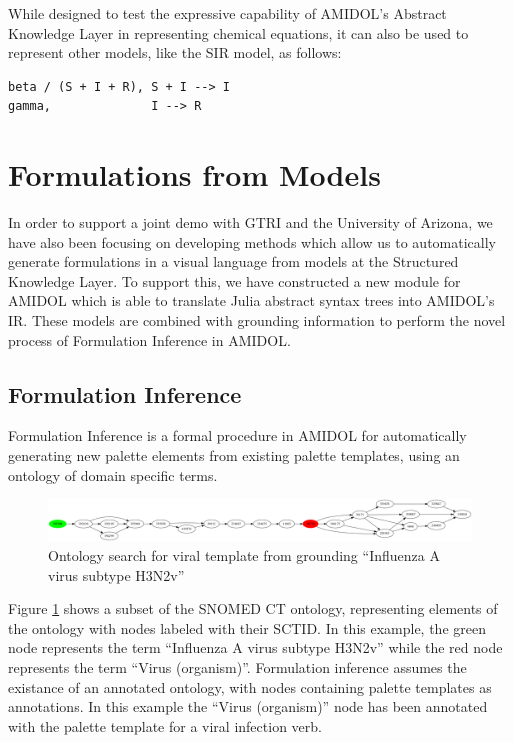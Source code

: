 \documentclass[11pt]{article}
\theoremstyle{definition}
\newcommand{\amidol}{\textsc{AMIDOL}}
\begin{document}
While designed to test the expressive capability of \amidol{}'s
Abstract Knowledge Layer in representing chemical equations, it can
also be used to represent other models, like the SIR model, as
follows:

\begin{lstlisting}[caption=Example Stochastic Chemical Equation]
beta / (S + I + R), S + I --> I
gamma,              I --> R
\end{lstlisting}

\section{Formulations from Models}

In order to support a joint demo with GTRI and the University of
Arizona, we have also been focusing on developing methods which allow
us to automatically generate formulations in a visual language from
models at the Structured Knowledge Layer.  To support this, we have
constructed a new module for \amidol{} which is able to translate
Julia abstract syntax trees into
\amidol{}'s IR.  These models are combined with grounding information
to perform the novel process of Formulation Inference in \amidol{}.

\subsection{Formulation Inference}

Formulation Inference is a formal procedure in \amidol{} for
automatically generating new palette elements from existing palette
templates, using an ontology of domain specific terms.

\begin{figure}
  \includegraphics[width=\textwidth]{H3N2vmap.png}
  \caption{Ontology search for viral template from grounding
    ``Influenza A virus subtype H3N2v''}
  \label{Fig:ontology1}
\end{figure}

Figure \ref{Fig:ontology1} shows a subset of the SNOMED CT ontology,
representing elements of the ontology with nodes labeled with their
SCTID.  In this example, the green node represents the term
``Influenza A virus subtype H3N2v'' while the red node represents the
term ``Virus (organism)''.  Formulation inference assumes the
existance of an annotated ontology, with nodes containing palette
templates as annotations.  In this example the ``Virus (organism)''
node has been annotated with the palette template for a viral
infection verb.
\end{document}
